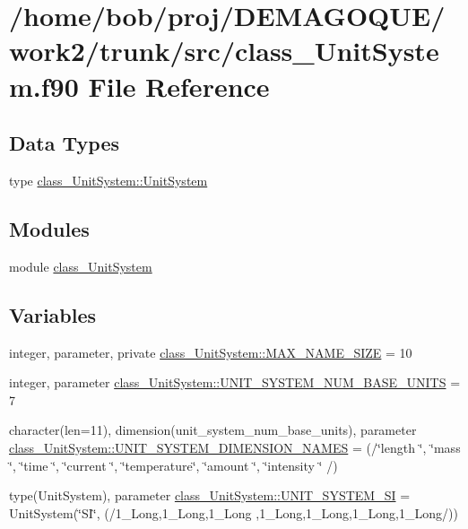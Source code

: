 \hypertarget{class__UnitSystem_8f90}{
\section{/home/bob/proj/DEMAGOQUE/work2/trunk/src/class\_\-UnitSystem.f90 File Reference}
\label{class__UnitSystem_8f90}
}
\subsection*{Data Types}
\begin{DoxyCompactItemize}
\item 
type \hyperlink{typeclass__UnitSystem_1_1UnitSystem}{class\_\-UnitSystem::UnitSystem}
\end{DoxyCompactItemize}
\subsection*{Modules}
\begin{DoxyCompactItemize}
\item 
module \hyperlink{namespaceclass__UnitSystem}{class\_\-UnitSystem}
\end{DoxyCompactItemize}
\subsection*{Variables}
\begin{DoxyCompactItemize}
\item 
integer, parameter, private \hyperlink{namespaceclass__UnitSystem_a2dc5b6d848def3f7f8306f80535efdc3}{class\_\-UnitSystem::MAX\_\-NAME\_\-SIZE} = 10
\item 
integer, parameter \hyperlink{namespaceclass__UnitSystem_a246bc92fbae303b4776c58fbf2dde427}{class\_\-UnitSystem::UNIT\_\-SYSTEM\_\-NUM\_\-BASE\_\-UNITS} = 7
\item 
character(len=11), dimension(unit\_\-system\_\-num\_\-base\_\-units), parameter \hyperlink{namespaceclass__UnitSystem_a858e9cba24dcf0fd6b7858ee3acfaed0}{class\_\-UnitSystem::UNIT\_\-SYSTEM\_\-DIMENSION\_\-NAMES} = (/\char`\"{}length \char`\"{}, \char`\"{}mass \char`\"{}, \char`\"{}time \char`\"{}, \char`\"{}current \char`\"{}, \char`\"{}temperature\char`\"{}, \char`\"{}amount \char`\"{}, \char`\"{}intensity \char`\"{} /)
\item 
type(UnitSystem), parameter \hyperlink{namespaceclass__UnitSystem_a45c989c4dd3741245372a6685f244345}{class\_\-UnitSystem::UNIT\_\-SYSTEM\_\-SI} = UnitSystem(\char`\"{}SI\char`\"{}, (/1\_\-Long,1\_\-Long,1\_\-Long ,1\_\-Long,1\_\-Long,1\_\-Long,1\_\-Long/))
\end{DoxyCompactItemize}
